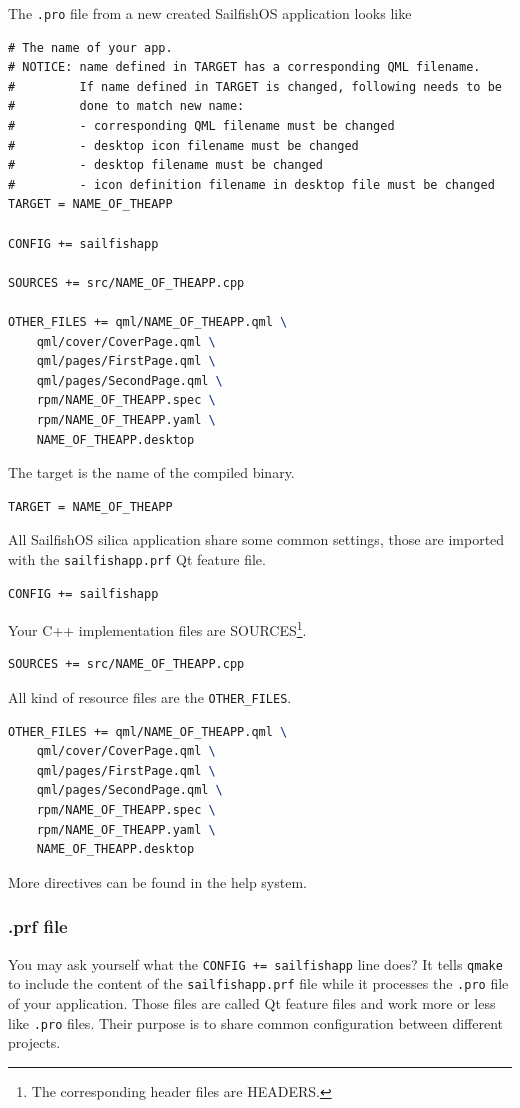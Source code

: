 %
The \verb,.pro, file from a new created SailfishOS application looks like
%
\begin{lstlisting}[language=tex]
# The name of your app.
# NOTICE: name defined in TARGET has a corresponding QML filename.
#         If name defined in TARGET is changed, following needs to be
#         done to match new name:
#         - corresponding QML filename must be changed
#         - desktop icon filename must be changed
#         - desktop filename must be changed
#         - icon definition filename in desktop file must be changed
TARGET = NAME_OF_THEAPP

CONFIG += sailfishapp

SOURCES += src/NAME_OF_THEAPP.cpp

OTHER_FILES += qml/NAME_OF_THEAPP.qml \
    qml/cover/CoverPage.qml \
    qml/pages/FirstPage.qml \
    qml/pages/SecondPage.qml \
    rpm/NAME_OF_THEAPP.spec \
    rpm/NAME_OF_THEAPP.yaml \
    NAME_OF_THEAPP.desktop
\end{lstlisting}
%
The target is the name of the compiled binary.
%
\begin{lstlisting}[language=tex]
TARGET = NAME_OF_THEAPP
\end{lstlisting}
%
All SailfishOS silica application share some common settings, those are imported with the \verb,sailfishapp.prf, Qt feature file.
%
\begin{lstlisting}[language=tex]
CONFIG += sailfishapp
\end{lstlisting}
%
Your C++ implementation files are SOURCES\footnote{The corresponding header files are HEADERS.}.
%
\begin{lstlisting}[language=tex]
SOURCES += src/NAME_OF_THEAPP.cpp
\end{lstlisting}
%
All kind of resource files are the \verb,OTHER_FILES,.
%
\begin{lstlisting}[language=tex]
OTHER_FILES += qml/NAME_OF_THEAPP.qml \
    qml/cover/CoverPage.qml \
    qml/pages/FirstPage.qml \
    qml/pages/SecondPage.qml \
    rpm/NAME_OF_THEAPP.spec \
    rpm/NAME_OF_THEAPP.yaml \
    NAME_OF_THEAPP.desktop
\end{lstlisting}
%
More directives can be found in the help system.
%
%
\subsubsection{.prf file}
%
You may ask yourself what the \verb,CONFIG += sailfishapp, line does? It tells \verb,qmake, to include the content of the \verb,sailfishapp.prf, file while it processes the \verb,.pro, file of your application. Those files are called Qt feature files and work more or less like \verb,.pro, files. Their purpose is to share common configuration between different projects.

